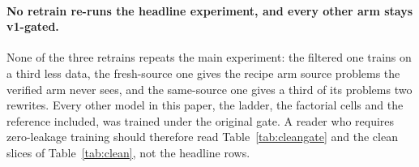 \paragraph{No retrain re-runs the headline experiment, and every other arm stays v1-gated.}None of the three retrains repeats the main experiment: the filtered one trains on a third less data, the fresh-source one gives the recipe arm source problems the verified arm never sees, and the same-source one gives a third of its problems two rewrites. Every other model in this paper, the ladder, the factorial cells and the reference included, was trained under the original gate. A reader who requires zero-leakage training should therefore read Table~\ref{tab:cleangate} and the clean slices of Table~\ref{tab:clean}, not the headline rows.
